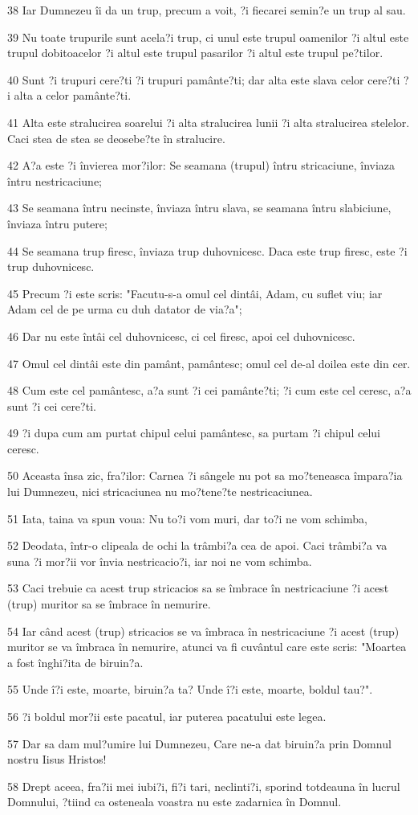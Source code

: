 \par 38 Iar Dumnezeu îi da un trup, precum a voit, ?i fiecarei semin?e un trup al sau.
\par 39 Nu toate trupurile sunt acela?i trup, ci unul este trupul oamenilor ?i altul este trupul dobitoacelor ?i altul este trupul pasarilor ?i altul este trupul pe?tilor.
\par 40 Sunt ?i trupuri cere?ti ?i trupuri pamânte?ti; dar alta este slava celor cere?ti ?i alta a celor pamânte?ti.
\par 41 Alta este stralucirea soarelui ?i alta stralucirea lunii ?i alta stralucirea stelelor. Caci stea de stea se deosebe?te în stralucire.
\par 42 A?a este ?i învierea mor?ilor: Se seamana (trupul) întru stricaciune, înviaza întru nestricaciune;
\par 43 Se seamana întru necinste, înviaza întru slava, se seamana întru slabiciune, înviaza întru putere;
\par 44 Se seamana trup firesc, înviaza trup duhovnicesc. Daca este trup firesc, este ?i trup duhovnicesc.
\par 45 Precum ?i este scris: "Facutu-s-a omul cel dintâi, Adam, cu suflet viu; iar Adam cel de pe urma cu duh datator de via?a";
\par 46 Dar nu este întâi cel duhovnicesc, ci cel firesc, apoi cel duhovnicesc.
\par 47 Omul cel dintâi este din pamânt, pamântesc; omul cel de-al doilea este din cer.
\par 48 Cum este cel pamântesc, a?a sunt ?i cei pamânte?ti; ?i cum este cel ceresc, a?a sunt ?i cei cere?ti.
\par 49 ?i dupa cum am purtat chipul celui pamântesc, sa purtam ?i chipul celui ceresc.
\par 50 Aceasta însa zic, fra?ilor: Carnea ?i sângele nu pot sa mo?teneasca împara?ia lui Dumnezeu, nici stricaciunea nu mo?tene?te nestricaciunea.
\par 51 Iata, taina va spun voua: Nu to?i vom muri, dar to?i ne vom schimba,
\par 52 Deodata, într-o clipeala de ochi la trâmbi?a cea de apoi. Caci trâmbi?a va suna ?i mor?ii vor învia nestricacio?i, iar noi ne vom schimba.
\par 53 Caci trebuie ca acest trup stricacios sa se îmbrace în nestricaciune ?i acest (trup) muritor sa se îmbrace în nemurire.
\par 54 Iar când acest (trup) stricacios se va îmbraca în nestricaciune ?i acest (trup) muritor se va îmbraca în nemurire, atunci va fi cuvântul care este scris: "Moartea a fost înghi?ita de biruin?a.
\par 55 Unde î?i este, moarte, biruin?a ta? Unde î?i este, moarte, boldul tau?".
\par 56 ?i boldul mor?ii este pacatul, iar puterea pacatului este legea.
\par 57 Dar sa dam mul?umire lui Dumnezeu, Care ne-a dat biruin?a prin Domnul nostru Iisus Hristos!
\par 58 Drept aceea, fra?ii mei iubi?i, fi?i tari, neclinti?i, sporind totdeauna în lucrul Domnului, ?tiind ca osteneala voastra nu este zadarnica în Domnul.

